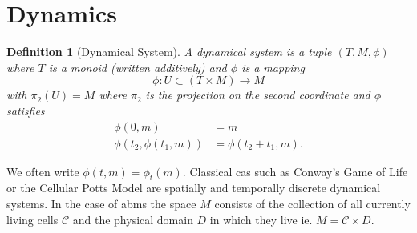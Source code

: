\documentclass{article}
\newtheorem{definition}{Definition}[section]
\begin{document}
\section{Dynamics}
\begin{definition}[Dynamical System]
    A dynamical system is a tuple $(T,M,\phi)$ where $T$ is a monoid (written additively) and
    $\phi$ is a mapping
    \begin{equation}
        \phi : U\subset(T\times M) \rightarrow M
    \end{equation}
    with $\pi_2(U) = M$ where $\pi_2$ is the projection on the second coordinate and $\phi$
    satisfies
    \begin{align}
        \phi(0,m) &= m\\
        \phi(t_2, \phi(t_1, m)) &= \phi(t_2+t_1,m).
    \end{align}
\end{definition}
We often write $\phi(t,m) = \phi_t(m)$.
Classical \acp{ca} such as Conway's Game of Life \cite{Graner1992} or the Cellular Potts Model
\cite{games1970fantastic} are spatially and temporally discrete dynamical systems.
In the case of \acp{abm} the space $M$ consists of the collection of all currently living cells
$\mathscr{C}$ and the physical domain $D$ in which they live ie. $M=\mathscr{C}\times D$.
\end{document}
